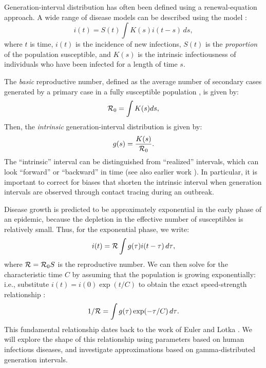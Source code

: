 \documentclass[12pt]{article}
\newcommand{\RR}{\ensuremath{{\cal R}}}
\newcommand{\Rx}[1]{\ensuremath{{\cal R}_{#1}}}
\newcommand{\Ro}{\Rx{0}}
\newcommand{\Tc}{\ensuremath{C}}
\begin{document}
Generation-interval distribution has often been defined using a renewal-equation approach.
A wide range of disease models can be described using the model 
\cite{heesterbeek1996concept,diekmann2000mathematical,roberts2004modelling,aldis2005integral,WallLips07,roberts2007model}:
\begin{equation}
i(t) = S(t)\int{K(s)i(t-s) \,ds},
\label{eq:Renewal}
\end{equation}
where $t$ is time, $i(t)$ is the incidence of new infections, $S(t)$ is the \emph{proportion} of the population susceptible, and $K(s)$ is the intrinsic infectiousness of individuals who have been infected for a length of time $s$.

The \emph{basic} reproductive number, defined as the average number of secondary cases generated by a primary case in a fully susceptible population \cite{AndeMay91, DiekHees90}, is given by:
\begin{equation}
\Ro = \int{K(s)ds},
\end{equation}
Then, the \emph{intrinsic} generation-interval distribution is given by:
\begin{equation}
g(s) = \frac{K(s)}{\Ro}.
\end{equation}
The ``intrinsic'' interval can be distinguished from ``realized'' intervals, which can look ``forward'' or ``backward'' in time \cite{ChamDush15} (see also earlier work \cite{Sven07,Nish10}). 
In particular, it is important to correct for biases that shorten the intrinsic interval when generation intervals are observed through contact tracing during an outbreak.

Disease growth is predicted to be approximately exponential in the early phase of an epidemic, because the depletion in the effective number of susceptibles is relatively small.
Thus, for the exponential phase, we write:
\begin{equation}
i(t) = \RR\int{g(\tau)i(t-\tau) \,d\tau},
\end{equation}
where $\RR = \Ro S$ is the reproductive number.
We can then solve for the characteristic time $\Tc$ by assuming that the population is growing exponentially: i.e., substitute $i(t) = i(0) \exp(t/\Tc)$ to obtain the exact speed-strength relationship \cite{diekmann2000mathematical}:
\begin{equation}
	1/\RR = \int{g(\tau)\exp(-\tau/\Tc) \,d\tau}.\label{eq:Euler}
\end{equation}
This fundamental relationship dates back to the work of Euler and Lotka \cite{Lotka}. We will explore the shape of this relationship using parameters based on human infectious diseases, and investigate approximations based on gamma-distributed generation intervals.
\end{document}
